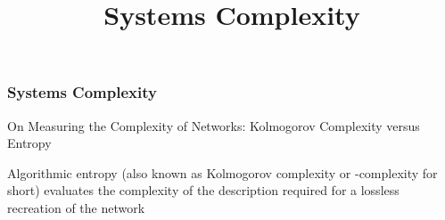 
\title[Systems Engineering]{Systems Complexity } 





\newpage
\begin{frame}
\frametitle{Systems Complexity }
\begin{block}{On Measuring the Complexity of Networks: Kolmogorov Complexity versus Entropy}


Algorithmic entropy (also known as Kolmogorov complexity or -complexity for short) evaluates the complexity of the description required for a lossless recreation of the network


 
\end{block}
\end{frame}




